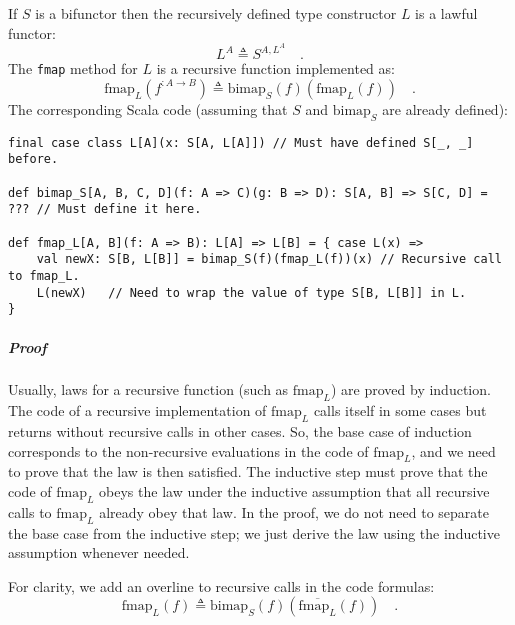 If $S$ is a bifunctor then the recursively defined type constructor
$L$ is a lawful functor:
\[
L^{A}\triangleq S^{A,L^{A}}\quad.
\]
The \lstinline!fmap! method for $L$ is a recursive function implemented
as:
\begin{equation}
\text{fmap}_{L}(f^{:A\rightarrow B})\triangleq\text{bimap}_{S}(f)(\text{fmap}_{L}(f))\quad.\label{eq:def-recursive-functor-fmap}
\end{equation}
The corresponding Scala code (assuming that $S$ and $\text{bimap}_{S}$
are already defined):
\begin{lstlisting}
final case class L[A](x: S[A, L[A]]) // Must have defined S[_, _] before.

def bimap_S[A, B, C, D](f: A => C)(g: B => D): S[A, B] => S[C, D] = ??? // Must define it here.

def fmap_L[A, B](f: A => B): L[A] => L[B] = { case L(x) =>
    val newX: S[B, L[B]] = bimap_S(f)(fmap_L(f))(x) // Recursive call to fmap_L.
    L(newX)   // Need to wrap the value of type S[B, L[B]] in L.
}
\end{lstlisting}


\subparagraph{Proof}

Usually, laws for a recursive
function (such as $\text{fmap}_{L}$) are proved by induction. The
code of a recursive implementation of $\text{fmap}_{L}$ calls itself
in some cases but returns without recursive calls in other cases.
So, the base case of induction corresponds to the non-recursive evaluations
in the code of $\text{fmap}_{L}$, and we need to prove that the law
is then satisfied. The inductive step must prove that the code of
$\text{fmap}_{L}$ obeys the law under the inductive assumption that
all recursive calls to $\text{fmap}_{L}$ already obey that law. In
the proof, we do not need to separate the base case from the inductive
step; we just derive the law using the inductive assumption whenever
needed.

For clarity, we add an overline to recursive calls in the code formulas:
\[
\text{fmap}_{L}(f)\triangleq\text{bimap}_{S}(f)(\overline{\text{fmap}_{L}}(f))\quad.
\]

